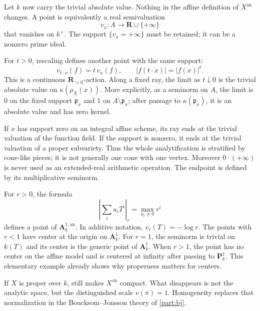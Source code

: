 Let $k$ now carry the trivial absolute value. Nothing in the affine
definition of $X^{\mathrm{an}}$ changes. A point is equivalently a real
semivaluation
\[
 v_x:A\longrightarrow\mathbf R\cup\{+\infty\}
\]
that vanishes on $k^\times$. The support
$\{v_x=+\infty\}$ must be retained; it can be a nonzero prime ideal.

For $t>0$, rescaling defines another point with the same support:
\[
                v_{t\cdot x}(f)=t\,v_x(f),
       \qquad |f(t\cdot x)|=|f(x)|^t.
\]
This is a continuous $\mathbf R_{>0}$-action. Along a fixed ray, the limit
as $t\downarrow0$ is the trivial absolute value on
$\kappa(\rho_X(x))$. More explicitly, as a seminorm on $A$, the limit is
$0$ on the fixed support $\mathfrak p_x$ and $1$ on
$A\setminus\mathfrak p_x$; after passage to
$\kappa(\mathfrak p_x)$, it is an absolute value and has zero kernel.

\begin{remark}
\label{rem:berk-trivial-cone-strata}
If $x$ has support zero on an integral affine scheme, its ray ends at the
trivial valuation of the function field. If the support is nonzero, it ends
at the trivial valuation of a proper subvariety. Thus the whole
analytification is stratified by cone-like pieces; it is not generally one
cone with one vertex. Moreover $0\cdot(+\infty)$ is never used as an
extended-real arithmetic operation. The endpoint is defined by its
multiplicative seminorm.
\end{remark}

\begin{example}
\label{ex:berk-trivial-affine-line}
For $r>0$, the formula
\[
 \left|\sum_i a_iT^i\right|_r=\max_{a_i\neq0}r^i
\]
defines a point of $\mathbf A^{1,\mathrm{an}}_k$. In additive notation,
$v_r(T)=-\log r$. The points with $r<1$ have center at the origin on
$\mathbf A^1_k$. For $r=1$, the seminorm is trivial on $k(T)$ and its
center is the generic point of $\mathbf A^1_k$. When $r>1$, the point
has no center on the affine model and is centered at infinity after passing
to $\mathbf P^1_k$. This elementary example already shows why properness
matters for centers.
\end{example}

If $X$ is proper over $k$,  still
makes $X^{\mathrm{an}}$ compact. What disappears is not the analytic
space, but the distinguished scale $v(\pi)=1$. Homogeneity replaces that
normalization in the Boucksom--Jonsson theory of \cref{part:bj}.

